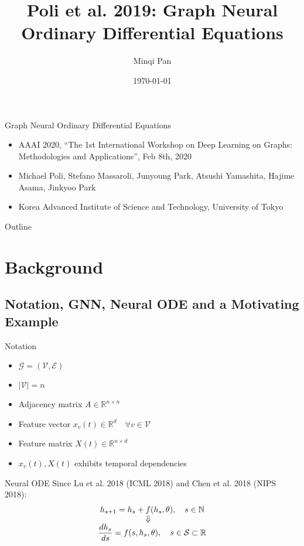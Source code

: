 \documentclass{beamer}
\title{Poli et al. 2019: Graph Neural Ordinary Differential Equations}
\author{Minqi Pan}
\date{\today}
\begin{document}
\begin{frame}
  \titlepage
\end{frame}

\begin{frame}{Graph Neural Ordinary Differential Equations}
\begin{itemize}
\item AAAI 2020, ``The 1st International Workshop on Deep Learning on Graphs: Methodologies and Applications'', Feb 8th, 2020
\item Michael Poli, Stefano Massaroli, Junyoung Park, Atsushi Yamashita, Hajime Asama, Jinkyoo Park
\item Korea Advanced Institute of Science and Technology, University of Tokyo
\end{itemize}
\end{frame}

\begin{frame}{Outline}
  \tableofcontents
\end{frame}

\section{Background}
\subsection{Notation, GNN, Neural ODE and a Motivating Example}
\begin{frame}{Notation}
\begin{itemize}
\item $\mathcal G=(\mathcal V,\mathcal E)$
\item $|\mathcal V|=n$
\item Adjacency matrix $A\in\mathbb{R}^{n\times n}$
\item Feature vector $x_v(t)\in\mathbb{R}^d\quad\forall v\in\mathcal V$
\item Feature matrix $X(t)\in\mathbb{R}^{n\times d}$
\item $x_v(t),X(t)$ exhibits temporal dependencies
\end{itemize}
\end{frame}

\begin{frame}{Neural ODE}
Since Lu et al. 2018 (ICML 2018) and Chen et al. 2018 (NIPS 2018):
\begin{gather*}
h_{s+1}=h_s+f(h_s,\theta),\quad s\in\mathbb{N}\\
\ArrowBetweenLines[\Downarrow]
\frac{dh_s}{ds}=f(s,h_s,\theta),\quad s\in\mathcal{S}\subset\mathbb{R}
\end{gather*}
\end{frame}
\end{document}
